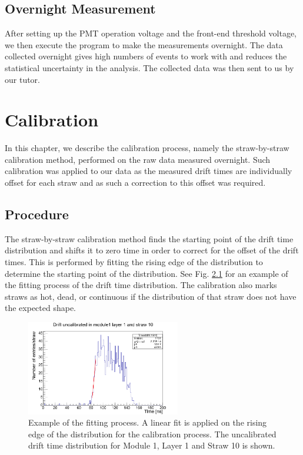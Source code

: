 \documentclass[a4paper]{report}
\numberwithin{equation}{section}
\begin{document}
\section{Overnight Measurement}

After setting up the PMT operation voltage and the front-end threshold voltage, we then execute the program to make the measurements overnight. The data collected overnight gives high numbers of events to work with and reduces the statistical uncertainty in the analysis. The collected data was then sent to us by our tutor. 



\chapter{Calibration} \label{chap:calib}

In this chapter, we describe the calibration process, namely the straw-by-straw calibration method, performed 
on the raw data measured overnight. Such calibration was applied to our data as the measured drift times 
are individually offset for each straw and as such a correction to this offset was required.

\section{Procedure} \label{sec:calib_proc}

The straw-by-straw calibration method finds the starting point of the drift time distribution and shifts it to 
zero time in order to correct for the offset of the drift times. This is performed by fitting the rising edge of the 
distribution to determine the starting point of the distribution. See Fig. \ref{fig:calib_drift_fit} for an example of the fitting process of the 
drift time distribution. The calibration also marks straws as hot, dead, or continuous if the distribution of that straw 
does not have the expected shape. \par 

\begin{figure}[htb!]
	\centering
	\includegraphics[width=0.6\textwidth]{calib_drift_m1l1s10_fit.png}
	\caption{Example of the fitting process. A linear fit is applied on the rising edge of the distribution for the calibration process. The uncalibrated drift time distribution
	 for Module 1, Layer 1 and Straw 10 is shown. }
	\label{fig:calib_drift_fit}
\end{figure}
\end{document}
